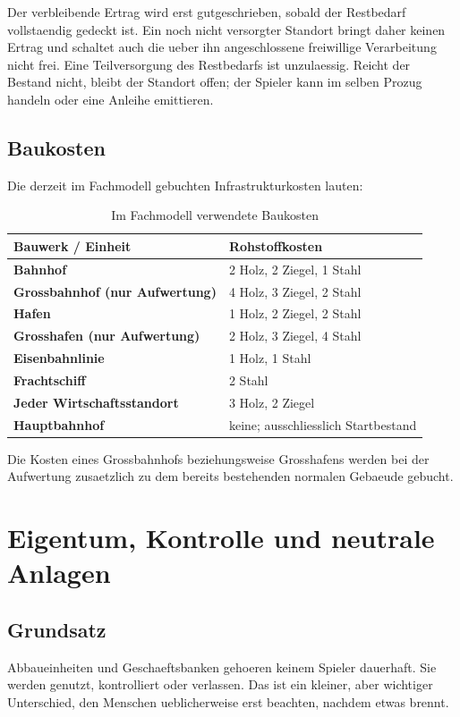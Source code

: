 \documentclass[11pt,a4paper,oneside,parskip=half]{scrreprt}
\begin{document}
Der verbleibende Ertrag wird erst gutgeschrieben, sobald der Restbedarf
vollstaendig gedeckt ist. Ein noch nicht versorgter Standort bringt daher keinen
Ertrag und schaltet auch die ueber ihn angeschlossene freiwillige Verarbeitung
nicht frei. Eine Teilversorgung des Restbedarfs ist unzulaessig. Reicht der
Bestand nicht, bleibt der Standort offen; der Spieler kann im selben Prozug
handeln oder eine Anleihe emittieren.

\section{Baukosten}
Die derzeit im Fachmodell gebuchten Infrastrukturkosten lauten:

\begin{table}[h]
\centering
\begin{tabularx}{\textwidth}{>{\bfseries}lX}
\toprule
Bauwerk / Einheit & Rohstoffkosten \\
\midrule
Bahnhof & 2 Holz, 2 Ziegel, 1 Stahl \\
Grossbahnhof (nur Aufwertung) & 4 Holz, 3 Ziegel, 2 Stahl \\
Hafen & 1 Holz, 2 Ziegel, 2 Stahl \\
Grosshafen (nur Aufwertung) & 2 Holz, 3 Ziegel, 4 Stahl \\
Eisenbahnlinie & 1 Holz, 1 Stahl \\
Frachtschiff & 2 Stahl \\
Jeder Wirtschaftsstandort & 3 Holz, 2 Ziegel \\
Hauptbahnhof & keine; ausschliesslich Startbestand \\
\bottomrule
\end{tabularx}
\caption{Im Fachmodell verwendete Baukosten}
\end{table}

Die Kosten eines Grossbahnhofs beziehungsweise Grosshafens werden bei der
Aufwertung zusaetzlich zu dem bereits bestehenden normalen Gebaeude gebucht.

\chapter{Eigentum, Kontrolle und neutrale Anlagen}

\section{Grundsatz}
Abbaueinheiten und Geschaeftsbanken gehoeren keinem Spieler dauerhaft. Sie werden genutzt, kontrolliert oder verlassen. Das ist ein kleiner, aber wichtiger Unterschied, den Menschen ueblicherweise erst beachten, nachdem etwas brennt.
\end{document}
